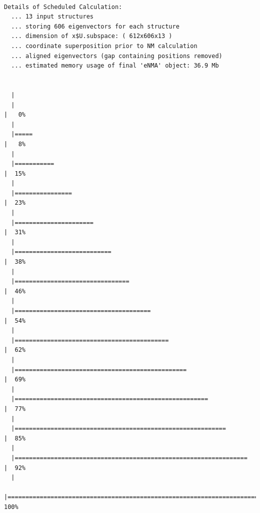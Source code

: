 \documentclass[
  letterpaper,
  DIV=11,
  numbers=noendperiod]{scrartcl}
\begin{document}
\begin{verbatim}

Details of Scheduled Calculation:
  ... 13 input structures 
  ... storing 606 eigenvectors for each structure 
  ... dimension of x$U.subspace: ( 612x606x13 )
  ... coordinate superposition prior to NM calculation 
  ... aligned eigenvectors (gap containing positions removed)  
  ... estimated memory usage of final 'eNMA' object: 36.9 Mb 


  |                                                                            
  |                                                                      |   0%
  |                                                                            
  |=====                                                                 |   8%
  |                                                                            
  |===========                                                           |  15%
  |                                                                            
  |================                                                      |  23%
  |                                                                            
  |======================                                                |  31%
  |                                                                            
  |===========================                                           |  38%
  |                                                                            
  |================================                                      |  46%
  |                                                                            
  |======================================                                |  54%
  |                                                                            
  |===========================================                           |  62%
  |                                                                            
  |================================================                      |  69%
  |                                                                            
  |======================================================                |  77%
  |                                                                            
  |===========================================================           |  85%
  |                                                                            
  |=================================================================     |  92%
  |                                                                            
  |======================================================================| 100%
\end{verbatim}
\end{document}

